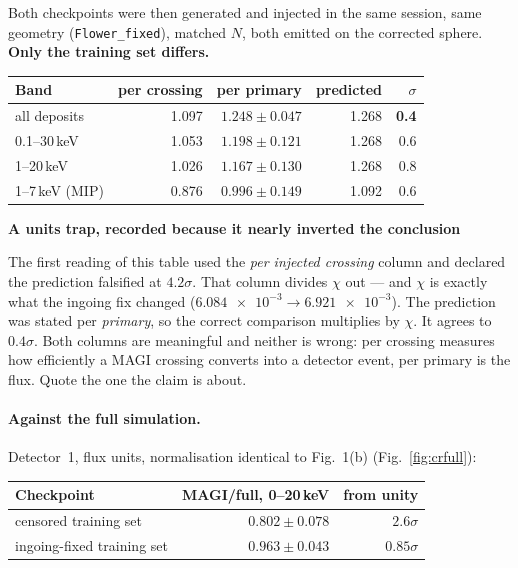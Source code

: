 \documentclass[11pt,a4paper]{article}
\newenvironment{callout}[3]%
{\par\medskip\noindent
 \def\calloutframe{#1}\def\calloutback{#2}%
 \setlength{\fboxrule}{0.9pt}\setlength{\fboxsep}{8pt}%
 \begin{lrbox}{\calloutbox}%
 \begin{minipage}{\dimexpr\textwidth-2\fboxsep-2\fboxrule\relax}%
 \setlength{\parskip}{4pt}%
 \textcolor{#1}{\textbf{#3}}\par\nobreak\smallskip}
{\end{minipage}\end{lrbox}%
 \fcolorbox{\calloutframe}{\calloutback}{\usebox{\calloutbox}}%
 \par\medskip}
\begin{document}
Both checkpoints were then generated and injected in the same session, same
geometry (\texttt{Flower\_fixed}), matched $N$, both emitted on the corrected
sphere. \textbf{Only the training set differs.}

\begin{center}
\begin{tabular}{lrrrr}
\toprule
Band & per crossing & \textbf{per primary} & predicted & $\sigma$ \\
\midrule
all deposits       & 1.097 & $\mathbf{1.248 \pm 0.047}$ & 1.268 & \textbf{0.4} \\
0.1--30\,keV       & 1.053 & $1.198 \pm 0.121$ & 1.268 & 0.6 \\
1--20\,keV         & 1.026 & $1.167 \pm 0.130$ & 1.268 & 0.8 \\
1--7\,keV (MIP)    & 0.876 & $0.996 \pm 0.149$ & 1.092 & 0.6 \\
\bottomrule
\end{tabular}
\end{center}

\begin{callout}{warn}{red!4}{A units trap, recorded because it nearly inverted
the conclusion}
The first reading of this table used the \emph{per injected crossing} column and
declared the prediction falsified at $4.2\sigma$. That column divides $\chi$ out
--- and $\chi$ is exactly what the ingoing fix changed
($\num{6.084e-3}\to\num{6.921e-3}$). The prediction was stated per \emph{primary},
so the correct comparison multiplies by $\chi$. It agrees to $0.4\sigma$.
Both columns are meaningful and neither is wrong: per crossing measures how
efficiently a MAGI crossing converts into a detector event, per primary is the
flux. Quote the one the claim is about.
\end{callout}

\paragraph{Against the full simulation.} Detector~1, flux units, normalisation
identical to Fig.~1(b) (Fig.~\ref{fig:crfull}):

\begin{center}
\begin{tabular}{lrr}
\toprule
Checkpoint & MAGI/full, 0--20\,keV & from unity \\
\midrule
censored training set      & $0.802 \pm 0.078$ & $2.6\sigma$ \\
ingoing-fixed training set & $\mathbf{0.963 \pm 0.043}$ & $0.85\sigma$ \\
\bottomrule
\end{tabular}
\end{center}
\end{document}
